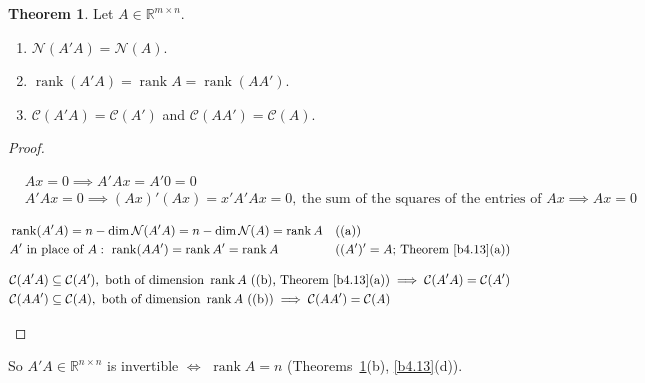\documentclass[12pt]{article}
\newcommand{\R}{\mathbb R}
\DeclareMathOperator{\rank}{rank}
\theoremstyle{definition}
\newtheorem{theorem}{Theorem}
\newcommand{\boardtop}{\vspace*{-\abovedisplayskip}}
\begin{document}
\begin{theorem}\label{b4.18}
Let \(A\in\R^{m\times n}\).
\begin{enumerate}
\item \(\mathcal N(A'A)=\mathcal N(A)\).
\item \(\rank(A'A)=\rank A=\rank(AA')\).
\item \(\mathcal C(A'A)=\mathcal C(A')\) and \(\mathcal C(AA')=\mathcal C(A)\).
\end{enumerate}
\end{theorem}
\begin{proof}
\begin{board}
\boardtop
\begin{align*}
&Ax=0\implies A'Ax=A'0=0\\
&A'Ax=0\implies(Ax)'(Ax)=x'A'Ax=0,\ \text{the sum of the squares of the entries of }Ax\implies Ax=0
\end{align*}
\end{board}
\begin{board}
\boardtop
\begin{align*}
&\rank(A'A)=n-\dim\mathcal N(A'A)=n-\dim\mathcal N(A)=\rank A&&\text{((a))}\\
&A'\text{ in place of }A:\ \rank(AA')=\rank A'=\rank A&&\text{(\((A')'=A\); Theorem~\ref{b4.13}(a))}
\end{align*}
\end{board}
\begin{board}
\boardtop
\begin{align*}
&\mathcal C(A'A)\subseteq\mathcal C(A'),\ \text{both of dimension }\rank A\ \text{((b), Theorem~\ref{b4.13}(a))}
\implies\mathcal C(A'A)=\mathcal C(A')\\
&\mathcal C(AA')\subseteq\mathcal C(A),\ \text{both of dimension }\rank A\ \text{((b))}\implies\mathcal C(AA')=\mathcal C(A)
\end{align*}
\end{board}
\nopagebreak
\end{proof}
So \(A'A\in\R^{n\times n}\) is invertible \(\iff\) \(\rank A=n\) (Theorems~\ref{b4.18}(b), \ref{b4.13}(d)).
\end{document}
